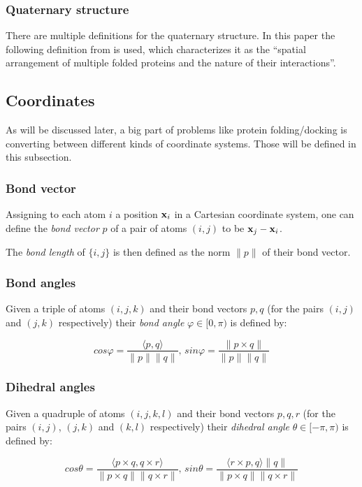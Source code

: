 \documentclass[12pt]{article}
\theoremstyle{definition}\newtheorem*{definition}{Definition}
\theoremstyle{definition}\newtheorem*{remark}{Remark}
\begin{document}
\subsubsection{Quaternary structure}
There are multiple definitions for the quaternary structure. In this paper the following definition from \cite{berg} is used, which characterizes it as the ``spatial arrangement of multiple folded proteins and the nature of their interactions''.


\subsection{Coordinates}\label{subsec:coords}
As will be discussed later, a big part of problems like protein folding/docking is converting between different kinds of coordinate systems. Those will be defined in this subsection.

\subsubsection{Bond vector}
Assigning to each atom $i$ a position $\bold x_i$ in a Cartesian coordinate system, one can define the \textit{bond vector} $p$ of a pair of atoms $(i,j)$ to be $\bold x_j - \bold x_i$.

The \textit{bond length} of $\{i,j\}$ is then defined as the norm $\|p\|$ of their bond vector.

\subsubsection{Bond angles}
Given a triple of atoms $(i,j,k)$ and their bond vectors $p,q$ (for the pairs $(i,j)$ and $(j,k)$ respectively) their \textit{bond angle} $\varphi\in[0,\pi)$ is defined by:

$$cos\varphi = \frac{\langle p,q\rangle}{\|p\|\|q\|}, \,sin\varphi = \frac{\|p\times q\|}{\|p\|\|q\|}$$

\subsubsection{Dihedral angles}
Given a quadruple of atoms $(i,j,k,l)$ and their bond vectors $p,q,r$ (for the pairs $(i,j)$, $(j,k)$ and $(k,l)$ respectively) their \textit{dihedral angle} $\theta\in[-\pi,\pi)$ is defined by:

$$cos\theta = \frac{\langle p\times q,q\times r\rangle}{\|p\times q\|\|q\times r\|}, \,sin\theta = \frac{\langle r\times p,q\rangle\|q\|}{\|p\times q\|\|q\times r\|}$$ 
\end{document}
